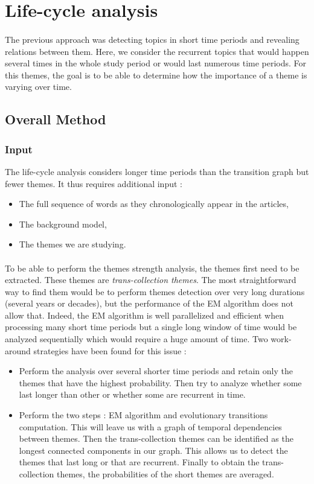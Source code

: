 \section{Life-cycle analysis}
\paragraph{}
The previous approach was detecting topics in short time periods and revealing relations between them. Here, we consider the recurrent topics that would happen several times in the whole study period or would last numerous time periods. For this themes, the goal is to be able to determine how the importance of a theme is varying over time.

\subsection{Overall Method}
\subsubsection*{Input}
The life-cycle analysis considers longer time periods than the transition graph but fewer themes. It thus requires additional input :
\begin{itemize}
\item The full sequence of words as they chronologically appear in the articles,
\item The background model,
\item The themes we are studying.
\end{itemize}

\paragraph{}
To be able to perform the themes strength analysis, the themes first need to be extracted. These themes are \emph{trans-collection themes}. The most straightforward way to find them would be to perform themes detection over very long durations (several years or decades), but the performance of the EM algorithm does not allow that. Indeed, the EM algorithm is well parallelized and efficient when processing many short time periods but a single long window of time would be analyzed sequentially which would require a huge amount of time. Two work-around strategies have been found for this issue :
\begin{itemize}
\item Perform the analysis over several shorter time periods and retain only the themes that have the highest probability. Then try to analyze whether some last longer than other or whether some are recurrent in time.
\item Perform the two steps : EM algorithm and evolutionary transitions computation. This will leave us with a graph of temporal dependencies between themes. Then the trans-collection themes can be identified as the longest connected components in our graph. This allows us to detect the themes that last long or that are recurrent. Finally to obtain the trans-collection themes, the probabilities of the short themes are averaged.
\end{itemize}

